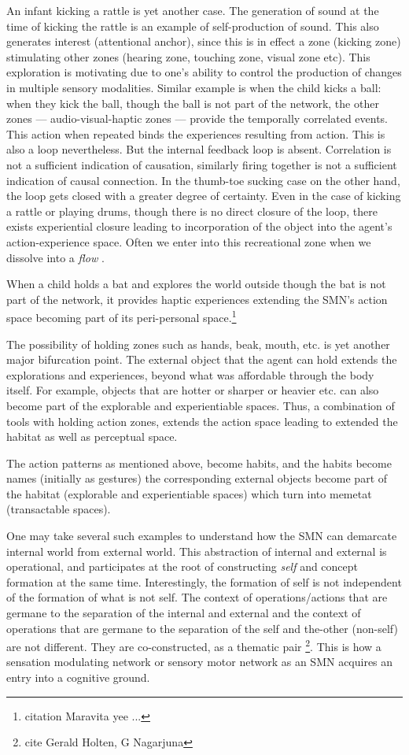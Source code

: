 An infant kicking a rattle is yet another case. The generation of sound at the time of kicking the rattle is an example of self-production of sound. This also generates interest (attentional anchor), since this is in effect a zone (kicking zone) stimulating other zones (hearing zone, touching zone, visual zone etc). This exploration is motivating due to one's ability to control the production of changes in multiple sensory modalities. Similar example is when the child kicks a ball: when they kick the ball, though the ball is not part of the network, the other zones --- audio-visual-haptic zones --- provide the temporally correlated events. This action when repeated binds the experiences resulting from action. This is also a loop nevertheless. But the internal feedback loop is absent. Correlation is not a sufficient indication of causation, similarly firing together is not a sufficient indication of causal connection. In the thumb-toe sucking case on the other hand, the loop gets closed with a greater degree of certainty. Even in the case of kicking a rattle or playing drums, though there is no direct closure of the loop, there exists experiential closure leading to incorporation of the object into the agent's action-experience space. Often we enter into this recreational zone when we dissolve into a \textit{flow} \cite{Mihaly}.

When a child holds a bat and explores the world outside though the bat is not part of the network, it provides haptic experiences extending the SMN's action space becoming part of its peri-personal space.\footnote{ citation Maravita yee ...}

The possibility of holding zones such as hands, beak, mouth, etc. is yet another major bifurcation point. The external object that the agent can hold extends the explorations and experiences, beyond what was affordable through the body itself. For example, objects that are hotter or sharper or heavier etc. can also become part of the explorable and experientiable spaces. Thus, a combination of tools with holding action zones, extends the action space leading to extended the habitat as well as perceptual space.

The action patterns as mentioned above, become habits, and the habits become names (initially as gestures) the corresponding external objects become part of the habitat (explorable and experientiable spaces) which turn into memetat (transactable spaces). 

One may take several such examples to understand how the SMN can demarcate internal world from external world. This abstraction of internal and external is operational, and participates at the root of constructing \textit{self} and concept formation at the same time. Interestingly, the formation of self is not independent of the formation of what is not self. The context of operations/actions that are germane to the separation of the internal and external and the context of operations that are germane to the separation of the self and the-other (non-self) are not different. They are co-constructed, as a thematic pair \footnote{ cite Gerald Holten, G Nagarjuna}. This is how a sensation modulating network or sensory motor network as an SMN acquires an entry into a cognitive ground.

